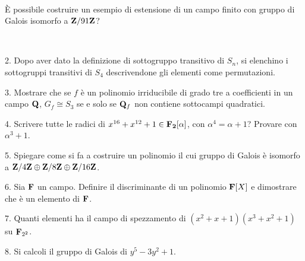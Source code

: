 \ \dotfill\ \bigskip\bigskip\bigskip\vfil

 \`E possibile costruire un esempio di estensione di un campo finito con gruppo di Galois isomorfo
a ${\bf Z}/91{\bf Z}$?\medskip\bigskip\bigskip

\ \dotfill\ \bigskip\bigskip\bigskip

\vfil\eject


\item{2.} Dopo aver dato la definizione di sottogruppo transitivo di
$S_n$, si elenchino i sottogruppi transitivi di $S_4$ descrivendone gli
elementi come permutazioni.

\vv


\item{3.} Mostrare che se $f$ \`{e} un polinomio irriducibile di grado tre a coefficienti
in un campo ${\bf Q}$, $G_f \cong S_3$ se e solo se ${\bf Q}_f$ non contiene sottocampi quadratici.
\ve\ \vs


\item{4.} Scrivere tutte le radici di $x^{16}+x^{12}+ 1\in {\bf F_2}[\alpha]$, con $\alpha^4=\alpha+1$? Provare con $\alpha^3+1$.\vv

\item{5.} Spiegare come si fa a costruire un polinomio il cui gruppo di Galois \`e isomorfo a ${\bf Z}/4{\bf Z} \oplus {\bf Z}/8{\bf Z} \oplus {\bf Z}/16{\bf Z}$. 
\ve\ \vs


\item{6.} Sia ${\bf F}$ un campo. Definire il discriminante di un polinomio ${\bf F}[X]$ e dimostrare che \`e un elemento di
${\bf F}$.\vskip 6cm\bigskip\bigskip\bigskip\vv\vv


\item{7.} Quanti elementi ha il campo di spezzamento di
$(x^2+x+1)(x^3+x^2+1)$ su ${\bf F}_{2^2}$.\vskip 3cm\bigskip\bigskip\bigskip\vv\vv

\item{8.} Si calcoli il gruppo di Galois di $y^5 - 3y^2 + 1$.\vv

\ \vst
 \bye
